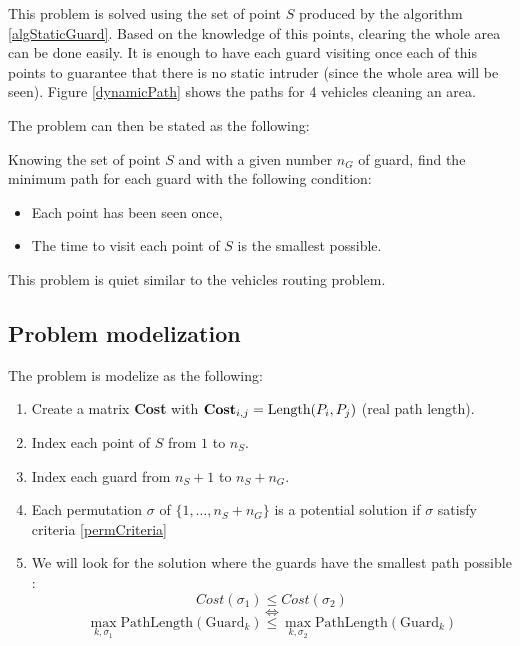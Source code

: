 This problem is solved using the set of point $S$ produced by the algorithm \ref{algStaticGuard}. Based on the knowledge of this points, clearing the whole area can be done easily. It is enough to have each guard visiting once each of this points to guarantee that there is no static intruder (since the whole area will be seen). Figure \ref{dynamicPath} shows the paths for 4 vehicles cleaning an area.

The problem can then be stated as the following:

\begin{subproblem}
 Knowing the set of point $S$ and with a given number $n_{G}$ of guard, find the minimum path for each guard with the following condition:
\begin{itemize}[topsep=0pt,itemsep=0ex,partopsep=1ex,parsep=1ex]
  \item Each point has been seen once,
  \item The time to visit each point of $S$ is the smallest possible.
 \end{itemize}
This problem is quiet similar to the vehicles routing problem.
\label{subProb3}
\end{subproblem}

\subsection{Problem modelization}

The problem is modelize as the following:

\begin{enumerate}[topsep=0pt,itemsep=0ex,partopsep=1ex,parsep=1ex]
  \item Create a matrix \textbf{Cost} with $\text{\textbf{Cost}}_{i,j} = \text{Length}(P_i,P_j)$ (real path length).
  \item Index each point of $S$ from $1$ to $n_{S}$.
  \item Index each guard from $n_{S}+1$ to $ n_{S}+n_{G}$.
  \item Each permutation $\sigma$ of $\{1,\hdots,n_{S}+n_{G}\}$ is a potential solution if $\sigma$ satisfy criteria \ref{permCriteria}
  \item  We will look for the solution where the guards have the smallest path possible : $$Cost(\sigma_1) \leq Cost(\sigma_2)$$ $$\Longleftrightarrow$$
	$$\max_{k,\sigma_1}\text{PathLength}(\text{Guard}_k)\leq \max_{k,\sigma_2}\text{PathLength}(\text{Guard}_k)$$
\end{enumerate}

